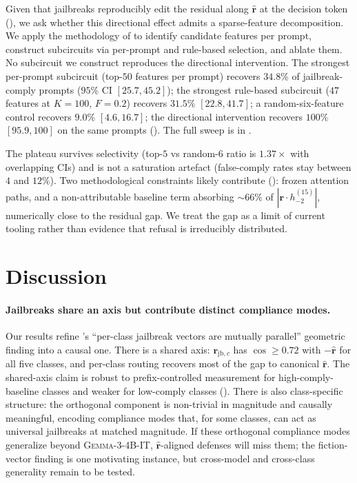 \documentclass{article}
\newcommand{\rhat}{\hat{\bm{r}}}
\newcommand{\rvec}{\bm{r}}
\newcommand{\rjbc}{\bm{r}_{\mathrm{jb},c}}
\newcommand{\gemma}{\textsc{Gemma-3-4B-IT}}
\begin{document}
Given that jailbreaks reproducibly edit the residual along $\rhat$
at the decision token (),
we ask whether this directional effect admits a sparse-feature
decomposition. We apply the methodology of  to
identify candidate features per prompt, construct subcircuits via
per-prompt and rule-based selection, and ablate them. No subcircuit
we construct reproduces the directional intervention. The strongest
per-prompt subcircuit (top-$50$ features per prompt) recovers
$34.8\%$ of jailbreak-comply prompts ($95\%$ CI $[25.7, 45.2]$); the
strongest rule-based subcircuit ($47$ features at $K=100$, $F=0.2$)
recovers $31.5\%$ $[22.8, 41.7]$; a random-six-feature control
recovers $9.0\%$ $[4.6, 16.7]$; the directional intervention recovers
$100\%$ $[95.9, 100]$ on the same prompts ().
The full sweep is in .

The plateau survives selectivity (top-$5$ vs random-$6$ ratio
is $1.37\times$ with overlapping CIs) and is not a saturation
artefact (false-comply rates stay between $4$ and $12\%$). Two
methodological constraints likely contribute
(): frozen attention paths, and a
non-attributable baseline term absorbing $\sim 66\%$ of
$|\rvec \cdot h_{-2}^{(15)}|$, numerically close to the residual
gap. We treat the gap as a limit of current tooling rather than
evidence that refusal is irreducibly distributed.

\section{Discussion}
\label{sec:discussion}

\paragraph{Jailbreaks share an axis but contribute distinct
compliance modes.} Our results refine
\citet{ball2024jailbreaks}'s ``per-class jailbreak vectors are
mutually parallel'' geometric finding into a causal one. There is a
shared axis: $\rjbc$ has $\cos \geq 0.72$ with $-\rhat$ for all five
classes, and per-class routing recovers most of the gap to canonical
$\rhat$. The shared-axis claim is robust to prefix-controlled
measurement for high-comply-baseline classes and weaker for
low-comply classes (). There is also
class-specific structure: the orthogonal component is non-trivial in
magnitude and causally meaningful, encoding compliance modes that,
for some classes, can act as universal jailbreaks at matched
magnitude. If these orthogonal compliance modes generalize beyond \gemma{}, $\rhat$-aligned defenses will miss them; the fiction-vector finding is one motivating instance, but cross-model and cross-class generality remain to be tested.
\end{document}
